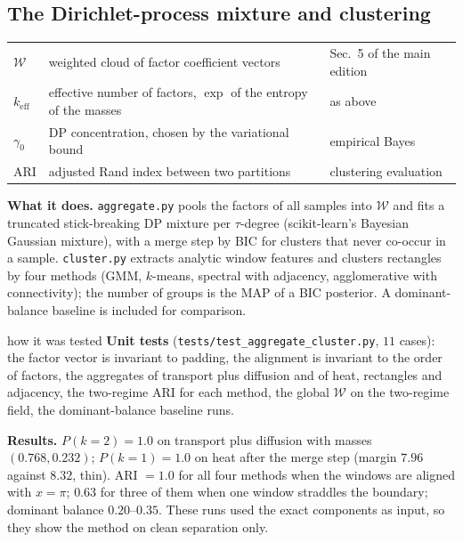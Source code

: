 \subsection{The Dirichlet-process mixture and clustering}\label{sec:dp}
\begin{symbols}
\begin{tabular}{@{}L{2.6cm}L{6.0cm}L{4.3cm}@{}}
$\mathcal W$ & weighted cloud of factor coefficient vectors & Sec.~5 of the main edition\\
$k_{\mathrm{eff}}$ & effective number of factors, $\exp$ of the entropy of the masses & as above\\
$\gamma_0$ & DP concentration, chosen by the variational bound & empirical Bayes\\
ARI & adjusted Rand index between two partitions & clustering evaluation\\
\end{tabular}
\end{symbols}
\textbf{What it does.} \texttt{aggregate.py} pools the factors of all samples into $\mathcal W$ and fits a truncated stick-breaking DP mixture per $\tau$-degree (scikit-learn's Bayesian Gaussian mixture), with a merge step by BIC for clusters that never co-occur in a sample. \texttt{cluster.py} extracts analytic window features and clusters rectangles by four methods (GMM, $k$-means, spectral with adjacency, agglomerative with connectivity); the number of groups is the MAP of a BIC posterior. A dominant-balance baseline is included for comparison.

\begin{explained}{how it was tested}
\textbf{Unit tests} (\texttt{tests/test\_aggregate\_cluster.py}, $11$ cases): the factor vector is invariant to padding, the alignment is invariant to the order of factors, the aggregates of transport plus diffusion and of heat, rectangles and adjacency, the two-regime ARI for each method, the global $\mathcal W$ on the two-regime field, the dominant-balance baseline runs.

\medskip\textbf{Results.} $P(k=2)=1.0$ on transport plus diffusion with masses $(0.768,0.232)$; $P(k=1)=1.0$ on heat after the merge step (margin $7.96$ against $8.32$, thin). ARI $=1.0$ for all four methods when the windows are aligned with $x=\pi$; $0.63$ for three of them when one window straddles the boundary; dominant balance $0.20$--$0.35$. These runs used the exact components as input, so they show the method on clean separation only.
\end{explained}


